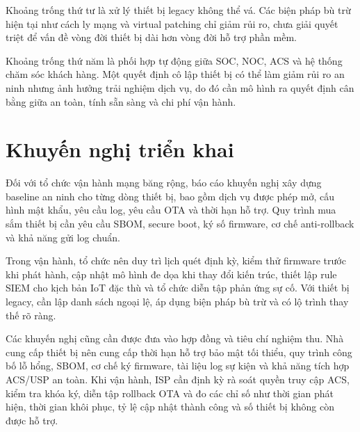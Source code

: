 \documentclass[../DoAn.tex]{subfiles}
\begin{document}
Khoảng trống thứ tư là xử lý thiết bị legacy không thể vá. Các biện pháp bù trừ hiện tại như cách ly mạng và virtual patching chỉ giảm rủi ro, chưa giải quyết triệt để vấn đề vòng đời thiết bị dài hơn vòng đời hỗ trợ phần mềm.

Khoảng trống thứ năm là phối hợp tự động giữa SOC, NOC, ACS và hệ thống chăm sóc khách hàng. Một quyết định cô lập thiết bị có thể làm giảm rủi ro an ninh nhưng ảnh hưởng trải nghiệm dịch vụ, do đó cần mô hình ra quyết định cân bằng giữa an toàn, tính sẵn sàng và chi phí vận hành.

\section{Khuyến nghị triển khai}
Đối với tổ chức vận hành mạng băng rộng, báo cáo khuyến nghị xây dựng baseline an ninh cho từng dòng thiết bị, bao gồm dịch vụ được phép mở, cấu hình mật khẩu, yêu cầu log, yêu cầu OTA và thời hạn hỗ trợ. Quy trình mua sắm thiết bị cần yêu cầu SBOM, secure boot, ký số firmware, cơ chế anti-rollback và khả năng gửi log chuẩn.

Trong vận hành, tổ chức nên duy trì lịch quét định kỳ, kiểm thử firmware trước khi phát hành, cập nhật mô hình đe dọa khi thay đổi kiến trúc, thiết lập rule SIEM cho kịch bản IoT đặc thù và tổ chức diễn tập phản ứng sự cố. Với thiết bị legacy, cần lập danh sách ngoại lệ, áp dụng biện pháp bù trừ và có lộ trình thay thế rõ ràng.

Các khuyến nghị cũng cần được đưa vào hợp đồng và tiêu chí nghiệm thu. Nhà cung cấp thiết bị nên cung cấp thời hạn hỗ trợ bảo mật tối thiểu, quy trình công bố lỗ hổng, SBOM, cơ chế ký firmware, tài liệu log sự kiện và khả năng tích hợp ACS/USP an toàn. Khi vận hành, ISP cần định kỳ rà soát quyền truy cập ACS, kiểm tra khóa ký, diễn tập rollback OTA và đo các chỉ số như thời gian phát hiện, thời gian khôi phục, tỷ lệ cập nhật thành công và số thiết bị không còn được hỗ trợ.
\end{document}
